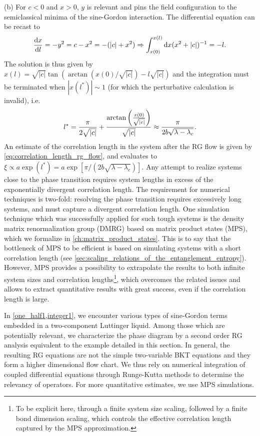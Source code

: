 (b) For $c<0$ and $x>0$, $y$ is relevant and pins the field configuration to the semiclassical minima of the sine-Gordon interaction.
The differential equation can be recast to
\begin{align}
    \frac{\mathrm d x}{\mathrm d l} = -y^2 = c-x^2 = -(|c|+x^2)
    \Rightarrow
    \int_{x(0)}^{x(l)}\mathrm d x(x^2+|c|)^{-1} = -l
    .
\end{align}
The solution is thus given by $x(l) = \sqrt{|c|}\tan(\arctan(x(0)/\sqrt{|c|})-l\sqrt{|c|})$ and the integration must be terminated when $|x(l^*)|\sim 1$ (for which the perturbative calculation is invalid), i.e.
\begin{align}
    l^*=\frac{\pi}{2\sqrt{|c|}}+\frac{\arctan\left( \frac{x(0)}{\sqrt{|c|}} \right)}{\sqrt{|c|}}\approx \frac{\pi}{2b\sqrt{\lambda-\lambda_c}}.
\end{align}
An estimate of the correlation length in the system after the RG flow is given by \cref{eq:correlation_length_rg_flow}, and evaluates to $\xi\propto a\exp(l^*)=a\exp[{{\pi}/({2b\sqrt{\lambda-\lambda_c}})}]$.
Any attempt to realize systems close to the phase transition requires system lengths in excess of the exponentially divergent correlation length.
The requirement for numerical techniques is two-fold: resolving the phase transition requires excessively long systems, and must capture a divergent correlation length.
One simulation technique which was successfully applied for such tough systems is the density matrix renormalization group (DMRG) based on matrix product states (MPS), which we formalize in \cref{ch:matrix_product_states}.
This is to say that the bottleneck of MPS to be efficient is based on simulating systems with a short correlation length (see \cref{sec:scaling_relations_of_the_entanglement_entropy}).
However, MPS provides a possibility to extrapolate the results to both infinite system sizes and correlation lengths\footnote{To be explicit here, through a finite system size scaling, followed by a finite bond dimension scaling, which controls the effective correlation length captured by the MPS approximation.}, which overcomes the related issues and allows to extract quantitative results with great success, even if the correlation length is large.

In \cref{one_half1,integer1}, we encounter various types of sine-Gordon terms embedded in a two-component Luttinger liquid.
Among those which are potentially relevant, we characterize the phase diagram by a second order RG analysis equivalent to the example detailed in this section.
In general, the resulting RG equations are not the simple two-variable BKT equations and they form a higher dimensional flow chart.
We thus rely on numerical integration of coupled differential equations through Runge-Kutta methods to determine the relevancy of operators.
For more quantitative estimates, we use MPS simulations.
